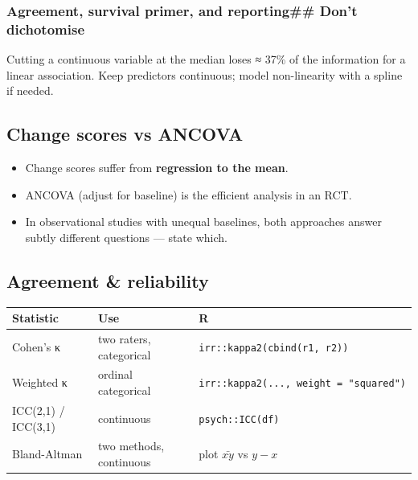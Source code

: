 \documentclass[
]{article}
\newcounter{none} %
\providecommand{\tightlist}{%
  \setlength{\itemsep}{0pt}\setlength{\parskip}{0pt}}
\begin{document}
\subsubsection{Agreement, survival primer, and reporting\#\# Don't
dichotomise}\label{agreement-survival-primer-and-reporting-dont-dichotomise}

Cutting a continuous variable at the median loses ≈ 37\% of the
information for a linear association. Keep predictors continuous; model
non-linearity with a spline if needed.

\subsection{Change scores vs ANCOVA}\label{change-scores-vs-ancova}

\begin{itemize}
\tightlist
\item
  Change scores suffer from \textbf{regression to the mean}.
\item
  ANCOVA (adjust for baseline) is the efficient analysis in an RCT.
\item
  In observational studies with unequal baselines, both approaches
  answer subtly different questions --- state which.
\end{itemize}

\subsection{Agreement \& reliability}\label{agreement-reliability}

{\def\LTcaptype{none} %
\begin{longtable}[]{@{}
  >{\raggedright\arraybackslash}p{}
  >{\raggedright\arraybackslash}p{}
  >{\raggedright\arraybackslash}p{}@{}}
\toprule\noalign{}
\begin{minipage}[b]{\linewidth}\raggedright
Statistic
\end{minipage} & \begin{minipage}[b]{\linewidth}\raggedright
Use
\end{minipage} & \begin{minipage}[b]{\linewidth}\raggedright
R
\end{minipage} \\
\midrule\noalign{}
\endhead
\bottomrule\noalign{}
\endlastfoot
Cohen's κ & two raters, categorical &
\texttt{irr::kappa2(cbind(r1,\ r2))} \\
Weighted κ & ordinal categorical &
\texttt{irr::kappa2(...,\ weight\ =\ "squared")} \\
ICC(2,1) / ICC(3,1) & continuous & \texttt{psych::ICC(df)} \\
Bland-Altman & two methods, continuous & plot \(\bar{xy}\) vs
\(y - x\) \\
\end{longtable}
}
\end{document}
